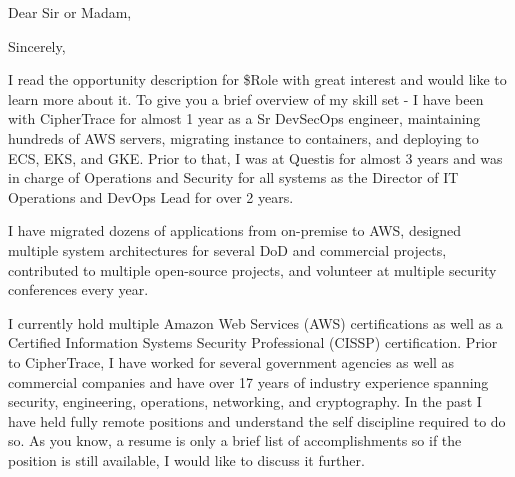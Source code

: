 \thispagestyle{empty}
\opening{Dear Sir or Madam,}
\closing{Sincerely,}
\makelettertitle

I read the opportunity description for \$Role with great interest and would like to learn more about it.
To give you a brief overview of my skill set - I have been with CipherTrace for almost 1 year as a Sr DevSecOps engineer, maintaining hundreds of AWS servers, migrating instance to containers, and deploying to ECS, EKS, and GKE.  Prior to that, I was at Questis for almost 3 years and was in charge of Operations and Security for all systems as the Director of IT Operations and DevOps Lead for over 2 years.

I have migrated dozens of applications from on-premise to AWS, designed multiple system architectures for several DoD and commercial projects, contributed to multiple open-source projects, and volunteer at multiple security conferences every year. 

I currently hold multiple Amazon Web Services (AWS) certifications as well as a Certified Information Systems Security Professional (CISSP) certification.  Prior to CipherTrace, I have worked for several government agencies as well as commercial companies and have over 17 years of industry experience spanning security, engineering, operations, networking, and cryptography.  In the past I have held fully remote positions and understand the self discipline required to do so.
As you know, a resume is only a brief list of accomplishments so if the position is still available, I would like to discuss it further.

\makeletterclosing
\clearpage
\setcounter{page}{1}